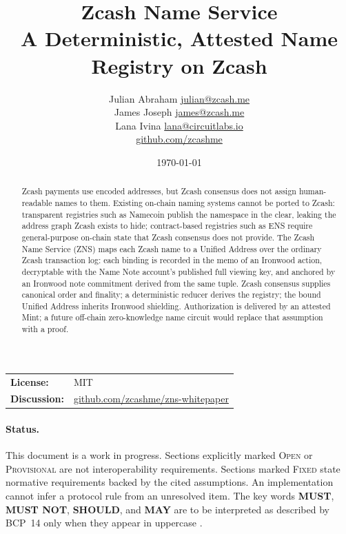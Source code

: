 \documentclass[11pt]{article}
\title{\textbf{Zcash Name Service}\\
\large A Deterministic, Attested Name Registry on Zcash}
\author{Julian Abraham \quad \href{mailto:julian@zcash.me}{julian@zcash.me} \\
James Joseph \quad \href{mailto:james@zcash.me}{james@zcash.me} \\
Lana Ivina \quad \href{mailto:lana@circuitlabs.io}{lana@circuitlabs.io} \\
\href{https://github.com/zcashme}{github.com/zcashme}}
\date{\today}
\newcommand{\zns}{\textsc{ZNS}}
\newcommand{\openstatus}{\textsc{Open}}
\newcommand{\provisional}{\textsc{Provisional}}
\newcommand{\fixedstatus}{\textsc{Fixed}}
\begin{document}
\maketitle

\begin{center}
\begin{tabular}{@{}ll@{}}
\textbf{License:} & MIT \\[0.2em]
\textbf{Discussion:} & \href{https://github.com/zcashme/zns-whitepaper}{github.com/zcashme/zns-whitepaper}
\end{tabular}
\end{center}

\begin{abstract}
Zcash payments use encoded addresses, but Zcash consensus does not assign human-readable names to them.
Existing on-chain naming systems cannot be ported to Zcash: transparent registries such as Namecoin publish the namespace in the clear, leaking the address graph Zcash exists to hide; contract-based registries such as ENS require general-purpose on-chain state that Zcash consensus does not provide.
The Zcash Name Service (\zns) maps each Zcash name to a Unified Address over the ordinary Zcash transaction log: each binding is recorded in the memo of an Ironwood action, decryptable with the Name Note account's published full viewing key, and anchored by an Ironwood note commitment derived from the same tuple.
Zcash consensus supplies canonical order and finality; a deterministic reducer derives the registry; the bound Unified Address inherits Ironwood shielding.
Authorization is delivered by an attested Mint; a future off-chain zero-knowledge name circuit would replace that assumption with a proof.
\end{abstract}

\paragraph{Status.}
This document is a work in progress.
Sections explicitly marked \openstatus{} or \provisional{} are not interoperability requirements.
Sections marked \fixedstatus{} state normative requirements backed by the cited assumptions.
An implementation cannot infer a protocol rule from an unresolved item.
The key words \textbf{MUST}, \textbf{MUST NOT}, \textbf{SHOULD}, and \textbf{MAY} are to be interpreted as described by BCP~14 only when they appear in uppercase \cite{bcp14}.










\end{document}
